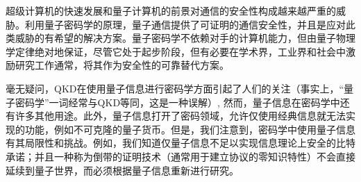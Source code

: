 超级计算机的快速发展和量子计算机的前景对通信的安全性构成越来越严重的威胁。利用量子密码学的原理，量子通信提供了可证明的通信安全性，并且是应对此类威胁的有希望的解决方案。量子密码学不依赖对手的计算机能力，但由量子物理学定律绝对地保证，尽管它处于起步阶段，但有必要在学术界，工业界和社会中激励研究工作通常，将其作为安全性的可靠替代方案。

毫无疑问，QKD在使用量子信息进行密码学方面引起了人们的关注（事实上，“量子密码学”一词经常与QKD等同，这是一种误解）, 然而，量子信息在密码学中还有许多其他用途。此外，量子信息打开了密码领域，允许仅使用经典信息就无法实现的功能，例如不可克隆的量子货币。但是，我们注意到，密码学中使用量子信息有其局限性和挑战。例如，我们知道仅量子信息不足以实现信息理论上安全的比特承诺；并且一种称为倒带的证明技术（通常用于建立协议的零知识特性）不会直接延续到量子世界，而必须根据量子信息重新进行研究。














